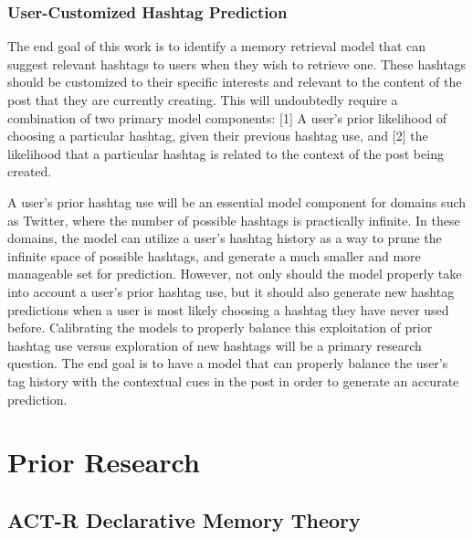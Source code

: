 \documentclass[man,floatsintext,donotrepeattitle]{apa6}
\begin{document}
\subsubsection{User-Customized Hashtag Prediction}

The end goal of this work is to identify a memory retrieval model that can suggest relevant hashtags to users when they wish to retrieve one.
These hashtags should be customized to their specific interests and relevant to the content of the post that they are currently creating.
This will undoubtedly require a combination of two primary model components:
[1] A user's prior likelihood of choosing a particular hashtag, given their previous hashtag use, and [2] the likelihood that a particular hashtag is related to the context of the post being created. 

A user's prior hashtag use will be an essential model component for domains such as Twitter, where the number of possible hashtags is practically infinite.
In these domains, the model can utilize a user's hashtag history as a way to prune the infinite space of possible hashtags, and generate a much smaller and more manageable set for prediction.
However, not only should the model properly take into account a user's prior hashtag use, but it should also generate new hashtag predictions when a user is most likely choosing a hashtag they have never used before.
Calibrating the models to properly balance this exploitation of prior hashtag use versus exploration of new hashtags will be a primary research question.
The end goal is to have a model that can properly balance the user's tag history with the contextual cues in the post in order to generate an accurate prediction.

\section{Prior Research}

\subsection{ACT-R Declarative Memory Theory}
\end{document}
